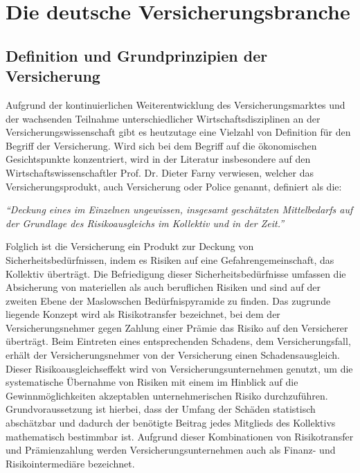 \section{Die deutsche Versicherungsbranche}

\subsection{Definition und Grundprinzipien der Versicherung}

Aufgrund der kontinuierlichen Weiterentwicklung des Versicherungsmarktes und der wachsenden Teilnahme unterschiedlicher Wirtschaftsdisziplinen an der Versicherungswissenschaft gibt es heutzutage eine Vielzahl von Definition für den Begriff der Versicherung. Wird sich bei dem Begriff auf die ökonomischen Gesichtspunkte konzentriert, wird in der Literatur insbesondere auf den Wirtschaftswissenschaftler Prof. Dr. Dieter Farny verwiesen, welcher das Versicherungsprodukt, auch Versicherung oder Police genannt, definiert als die: 

\begin{center}
    \textit{\enquote{Deckung eines im Einzelnen ungewissen, insgesamt geschätzten Mittelbedarfs auf der Grundlage des Risikoausgleichs im Kollektiv und in der Zeit.}} \autocite[S. 8f.]{FARNY2011}
\end{center}

Folglich ist die Versicherung ein Produkt zur Deckung von Sicherheitsbedürfnissen, indem es Risiken auf eine Gefahrengemeinschaft, das Kollektiv überträgt. Die Befriedigung dieser Sicherheitsbedürfnisse umfassen die Absicherung von materiellen als auch beruflichen Risiken und sind auf der zweiten Ebene der Maslowschen Bedürfnispyramide zu finden. \autocite[Vgl.][S. 30]{BECKER2019} Das zugrunde liegende Konzept wird als Risikotransfer bezeichnet, bei dem der Versicherungsnehmer gegen Zahlung einer Prämie das Risiko auf den Versicherer überträgt. Beim Eintreten eines entsprechenden Schadens, dem Versicherungsfall, erhält der Versicherungsnehmer von der Versicherung einen Schadensausgleich. Dieser Risikoausgleichseffekt wird von Versicherungsunternehmen genutzt, um die systematische Übernahme von Risiken mit einem im Hinblick auf die Gewinnmöglichkeiten akzeptablen unternehmerischen Risiko durchzuführen. \autocite[Vgl.][S. 9]{FARNY2011}
Grundvoraussetzung ist hierbei, dass der Umfang der Schäden statistisch abschätzbar und dadurch der benötigte Beitrag jedes Mitglieds des Kollektivs mathematisch bestimmbar ist. Aufgrund dieser Kombinationen von Risikotransfer und Prämienzahlung werden Versicherungsunternehmen auch als Finanz- und Risikointermediäre bezeichnet. \autocite[Vgl.][S. 53]{ZWACK2017}

